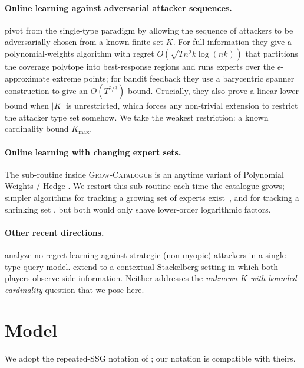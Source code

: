 \documentclass[letterpaper,9pt,twocolumn]{extarticle}
\newcommand{\Kmax}{K_{\max}}
\theoremstyle{plain}
\theoremstyle{definition}
\theoremstyle{remark}
\begin{document}
\paragraph{Online learning against adversarial attacker sequences.}
\citet{balcan2015} pivot from the single-type paradigm by allowing the
sequence of attackers to be adversarially chosen from a known finite set
$K$. For full information they give a polynomial-weights algorithm with
regret $O(\sqrt{Tn^2 k\log(nk)})$ that partitions the coverage polytope
into best-response regions and runs experts over the
$\epsilon$-approximate extreme points; for bandit feedback they use a
barycentric spanner construction to give an $O(T^{2/3})$ bound.
Crucially, they also prove a linear lower bound when $|K|$ is unrestricted,
which forces any non-trivial extension to restrict the attacker type set
somehow. We take the weakest restriction: a known cardinality bound
$\Kmax$.

\paragraph{Online learning with changing expert sets.}
The sub-routine inside \textsc{Grow-Catalogue} is an anytime variant of
Polynomial Weights / Hedge \citep{littlestone1994,freund1997,cesa2006}. We
restart this sub-routine each time the catalogue grows; simpler algorithms
for tracking a growing set of experts exist~\citep{mourtada2017}, and for
tracking a shrinking set \citep{gaillard2019}, but both would only shave
lower-order logarithmic factors.

\paragraph{Other recent directions.}
\citet{haghtalab2022} analyze no-regret learning against strategic
(non-myopic) attackers in a single-type query model. \citet{harris2024side}
extend to a contextual Stackelberg setting in which both players observe
side information. Neither addresses the \emph{unknown $K$ with bounded
cardinality} question that we pose here.
\section{Model}
\label{sec:model}

We adopt the repeated-SSG notation of \citet[Sec.~2]{balcan2015}; our
notation is compatible with theirs.
\end{document}
